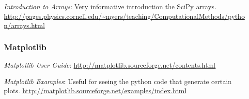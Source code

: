 \noindent \emph{Introduction to Arrays}: Very informative introduction the SciPy arrays. \url{http://pages.physics.cornell.edu/~myers/teaching/ComputationalMethods/python/arrays.html}

\subsubsection*{Matplotlib}
\noindent \emph{Matplotlib User Guide}: \url{http://matplotlib.sourceforge.net/contents.html}

\noindent \emph{Matplotlib Examples}: Useful for seeing the python code that generate certain plots. \url{http://matplotlib.sourceforge.net/examples/index.html}



